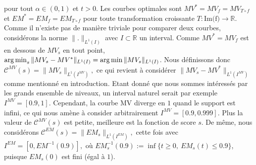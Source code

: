 \documentclass[a4paper, 12pt]{article}
\newcommand{\crit}{\mathcal{C}}
\def\rset{\mathbb{R}}
\def\crit{\mathcal{C}}
\def\argmin{\operatornamewithlimits{arg\,min}}
\begin{document}
pour tout $\alpha\in (0,1)$ et $t >0$.
%
Les courbes optimales sont $MV^* = MV_f = MV_{T \circ f}$ et $EM^* = EM_f = EM_{T \circ f}$ pour toute transformation croissante $T: \text{Im(f)} \to \mathbb{R}$.
%
Comme il n'existe pas de manière triviale pour comparer deux courbes, considérons la norme $\|.\|_{L^1(I)}$ avec $I\subset \rset$ un interval. Comme $MV^*=MV_f$ est en dessous de $MV_s$ en tout point, $\argmin_s \| MV_s - MV^* \|_{L^1(I)} = \argmin \| MV_s \|_{L^1(I)} $. Nous définissons donc
$\crit^{MV}(s) = \| MV_s \|_{L^1(I^{MV})},$ ce qui revient à considérer $\| MV_s - MV^* \|_{L^1(I^{MV})}$ comme mentionné en introduction. 
Etant donné que nous sommes intéressés par les grands ensemble de niveaux, un interval naturel serait par exemple $I^{MV} = [0.9, 1]$. Cependant, la courbe MV diverge en $1$ quand le support est infini, ce qui nous amène à consider arbitrairement $I^{MV} = [0.9, 0.999].$
Plus la valeur de $\crit^{MV}(s)$ est petite, meilleure est la fonction de score $s$.
%
De même, nous considérons $\crit^{EM}(s) = \|EM_s\|_{L^1(I^{EM})},$ cette fois avec $I^{EM} = [0,EM^{-1}(0.9)],$ où $EM_s^{-1}(0.9) := \inf\{t\ge 0,~ EM_s(t) \le 0.9\}$, puisque $EM_s(0)$ est fini (égal à $1$). 

\end{document}
